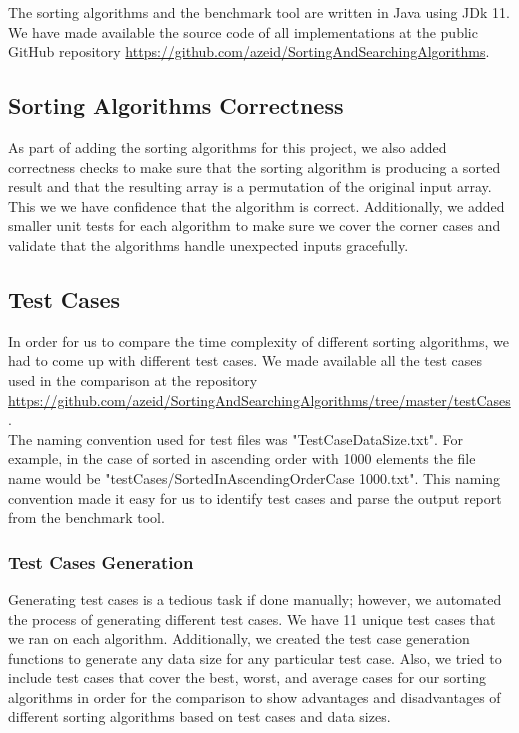 The sorting algorithms and the benchmark tool are written in Java using JDk 11. We have made available the source code of all implementations at the public GitHub repository \url{https://github.com/azeid/SortingAndSearchingAlgorithms}.

\subsection{Sorting Algorithms Correctness}
As part of adding the sorting algorithms for this project, we also added correctness checks to make sure that the sorting algorithm is producing a sorted result and that the resulting array is a permutation of the original input array. This we we have confidence that the algorithm is correct. Additionally, we added smaller unit tests for each algorithm to make sure we cover the corner cases and validate that the algorithms handle unexpected inputs gracefully.

\subsection{Test Cases}
In order for us to compare the time complexity of different sorting algorithms, we had to come up with different test cases. We made available all the test cases used in the comparison at the repository \url{https://github.com/azeid/SortingAndSearchingAlgorithms/tree/master/testCases}.\\
The naming convention used for test files was "TestCase\textunderscore DataSize.txt". For example, in the case of sorted in ascending order with 1000 elements the file name would be "testCases/SortedInAscendingOrderCase \textunderscore 1000.txt". This naming convention made it easy for us to identify test cases and parse the output report from the benchmark tool.

\subsubsection{Test Cases Generation}
Generating test cases is a tedious task if done manually; however, we automated the process of generating different test cases. We have 11 unique test cases that we ran on each algorithm. Additionally, we created the test case generation functions to generate any data size for any particular test case. Also, we tried to include test cases that cover the best, worst, and average cases for our sorting algorithms in order for the comparison to show advantages and disadvantages of different sorting algorithms based on test cases and data sizes.

